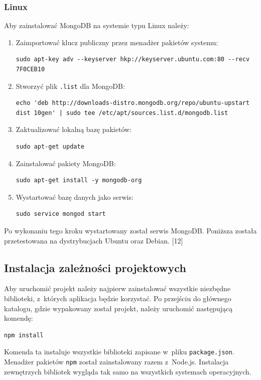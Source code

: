 \documentclass[8pt,a4paper,notitlepage]{article}
\begin{document}
\subsubsection{Linux}
Aby zainstalować MongoDB na systemie typu Linux należy: 
\begin{enumerate}
\item Zaimportować klucz publiczny przez menadżer pakietów systemu:
\begin{lstlisting}
sudo apt-key adv --keyserver hkp://keyserver.ubuntu.com:80 --recv 7F0CEB10
\end{lstlisting}

\item Stworzyć plik \texttt{.list} dla MongoDB:
\begin{lstlisting}
echo 'deb http://downloads-distro.mongodb.org/repo/ubuntu-upstart dist 10gen' | sudo tee /etc/apt/sources.list.d/mongodb.list
\end{lstlisting}

\item Zaktualizować lokalną bazę pakietów:
\begin{lstlisting}
sudo apt-get update
\end{lstlisting}

\item Zainstalować pakiety MongoDB:
\begin{lstlisting}
sudo apt-get install -y mongodb-org
\end{lstlisting}

\item Wystartować bazę danych jako serwis:
\begin{lstlisting}
sudo service mongod start
\end{lstlisting}
\end{enumerate}

Po wykonaniu tego kroku wystartowany został serwis MongoDB. Poniższa została przetestowana na dystrybucjach Ubuntu oraz Debian. [12]



\subsection{Instalacja zależności projektowych}
Aby uruchomić projekt należy najpierw zainstalować wszystkie niezbędne biblioteki, z~których aplikacja będzie korzystać. Po przejściu do głównego katalogu, gdzie wypakowany został projekt, należy uruchomić następującą komendę:
\begin{lstlisting}
npm install
\end{lstlisting}
Komenda ta instaluje wszystkie biblioteki zapisane w~pliku \texttt{package.json}. Menadżer pakietów \texttt{npm} został zainstalowany razem z~Node.js. Instalacja zewnętrzych bibliotek wygląda tak samo na wszystkich systemach operacyjnych.
\end{document}
